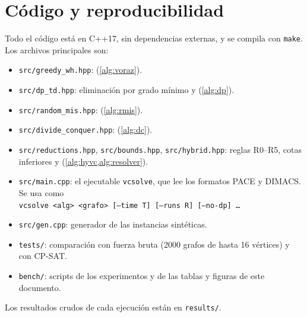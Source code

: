 \section{Código y reproducibilidad}\label{app:codigo}
Todo el código está en C++17, sin dependencias externas, y se compila con \texttt{make}. Los archivos principales son:
\begin{itemize}
  \item \texttt{src/greedy\_wh.hpp}:  (\cref{alg:voraz}).
  \item \texttt{src/dp\_td.hpp}: eliminación por grado mínimo y  (\cref{alg:dp}).
  \item \texttt{src/random\_mis.hpp}:  (\cref{alg:rmis}).
  \item \texttt{src/divide\_conquer.hpp}:  (\cref{alg:dc}).
  \item \texttt{src/reductions.hpp}, \texttt{src/bounds.hpp}, \texttt{src/hybrid.hpp}: reglas R0--R5, cotas inferiores y \hyvc{} (\cref{alg:hyvc,alg:resolver}).
  \item \texttt{src/main.cpp}: el ejecutable \texttt{vcsolve}, que lee los formatos PACE y DIMACS. Se usa como\\ \texttt{vcsolve <alg> <grafo> [--time T] [--runs R] [--no-dp] \dots}
  \item \texttt{src/gen.cpp}: generador de las instancias sintéticas.
  \item \texttt{tests/}: comparación con fuerza bruta (2000 grafos de hasta 16 vértices) y con CP-SAT.
  \item \texttt{bench/}: scripts de los experimentos y de las tablas y figuras de este documento.
\end{itemize}
Los resultados crudos de cada ejecución están en \texttt{results/}.
